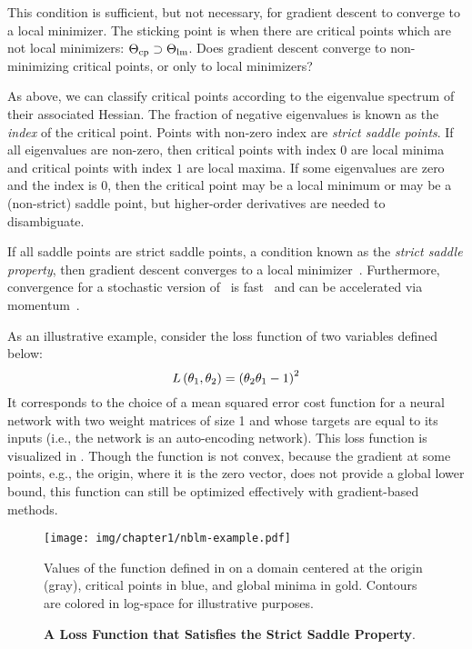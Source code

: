 \documentclass[../../thesis.tex]{subfiles}
\begin{document}
This condition is sufficient, but not necessary,
for gradient descent to converge to a local minimizer.
The sticking point is when there are
critical points which are not local minimizers:
$\Theta_{\mathrm{cp}} \supset \Theta_{\mathrm{lm}}$.
Does gradient descent converge to non-minimizing critical points,
or only to local minimizers?

As above, we can classify critical points according to the
eigenvalue spectrum of their associated Hessian.
The fraction of negative eigenvalues is known as the
\emph{index} of the critical point.
Points with non-zero index are \emph{strict saddle points}.
If all eigenvalues are non-zero,
then critical points with index $0$ are local minima
and critical points with index $1$ are local maxima.
If some eigenvalues are zero and the index is $0$,
then the critical point may be a local minimum
or may be a (non-strict) saddle point,
but higher-order derivatives are needed to disambiguate.

If all saddle points are strict saddle points,
a condition known as the \emph{strict saddle property},
then gradient descent converges to a local minimizer~\cite{lee2016}.
Furthermore, convergence for a stochastic
version of~ is fast~\cite{jin2018a}
and can be accelerated via momentum~\cite{jin2018b}.

As an illustrative example, consider the loss function
of two variables defined below:
\begin{equation}\equationlabel{nblm-example}
	L\left(\theta_1, \theta_2\right) = {\left(\theta_2\theta_1 - 1\right)}^2
\end{equation}
It corresponds to the choice of a mean squared error cost function
for a neural network with two weight matrices of size 1
and whose targets are equal to its inputs
(i.e., the network is an auto-encoding network).
This loss function is visualized in
.
Though the function is not convex,
because the gradient at some points, e.g., the origin,
where it is the zero vector,
does not provide a global lower bound,
this function can still be optimized effectively with
gradient-based methods.

\begin{figure}
	\begin{center}
		\texttt{[image: img/chapter1/nblm-example.pdf]}
	\end{center}
	\caption{\textbf{A Loss Function that Satisfies the Strict Saddle Property}.}{Values
	of the function defined in 
	on a domain centered at the origin (gray),
	critical points in blue, and global minima in gold.
	Contours are colored in log-space for illustrative purposes.}
\end{figure}
\end{document}
